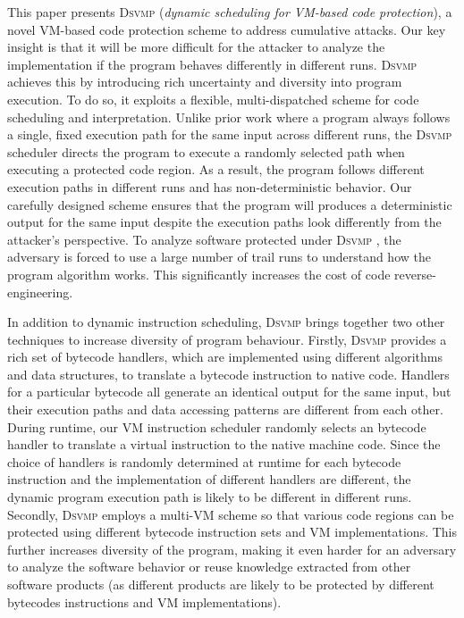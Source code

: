 \documentclass[times]{secauth}
\newcommand{\DSVMP}{\textsc{Dsvmp }}
\begin{document}
This paper presents \DSVMP (\emph{dynamic scheduling for VM-based code protection}),
a novel VM-based code protection scheme to address cumulative attacks.
Our key insight is that it will be more difficult for the attacker
to analyze the implementation if the program behaves differently in different runs.
\DSVMP achieves this by introducing rich uncertainty and diversity into program execution.
To do so, it exploits a flexible, multi-dispatched scheme for code scheduling and interpretation.
Unlike prior work where a program always follows a single, fixed execution path for the same input across different runs,
the \DSVMP scheduler directs the program to execute a randomly selected path when executing a protected code region.
As a result, the program follows different execution paths in different runs and has non-deterministic behavior.
Our carefully designed scheme ensures that the program will produces a deterministic output
for the same input despite the execution paths look differently from the attacker's perspective.
To analyze software protected under \DSVMP, the adversary is forced to use a large number of trail runs
to understand how the program algorithm works. This significantly increases the cost of code reverse-engineering.


In addition to dynamic instruction scheduling, \DSVMP brings together two other techniques to increase diversity of program behaviour.
Firstly, \DSVMP provides a rich set of bytecode handlers, which are implemented using different algorithms and data structures,
to translate a bytecode instruction to native code.
Handlers for a particular bytecode all generate an identical output for the same input,
but their execution paths and data accessing patterns are different from each other.
During runtime, our VM instruction scheduler randomly selects an bytecode handler
to translate a virtual instruction to the native machine code.
Since the choice of handlers is randomly determined at runtime for each bytecode
instruction and the implementation of different handlers are different,
the dynamic program execution path is likely to be different in different runs.
Secondly, \DSVMP employs a multi-VM scheme so that various code regions
can be protected using different bytecode instruction sets and VM implementations.
This further increases diversity of the program, making it even harder for an adversary to analyze
the software behavior or reuse knowledge extracted from other software products
(as different products are likely to be protected by different bytecodes instructions and VM implementations).
\end{document}
